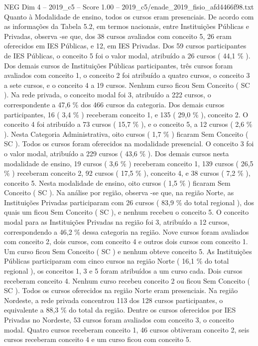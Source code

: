 \begin{textsample}{NEG Dim 4 – 2019\_c5 – Score 1.00 – 2019\_c5/enade\_2019\_fisio\_afd4466f98.txt}
Quanto à Modalidade de ensino, todos os cursos eram presenciais.
De acordo com as informações da Tabela 5.2, em termos nacionais, entre Instituições Públicas e Privadas, observa -se que, dos 38 cursos avaliados com conceito 5, 26 eram oferecidos em IES Públicas, e 12, em IES Privadas.
Dos 59 cursos participantes de IES Públicas, o conceito 5 foi o valor modal, atribuído a 26 cursos ( 44,1 \% ).
Dos demais cursos de Instituições Públicas participantes, três cursos foram avaliados com conceito 1, o conceito 2 foi atribuído a quatro cursos, o conceito 3 a sete cursos, e o conceito 4 a 19 cursos.
Nenhum curso ficou Sem Conceito ( SC ).
Na rede privada, o conceito modal foi 3, atribuído a 222 cursos, o correspondente a 47,6 \% dos 466 cursos da categoria.
Dos demais cursos participantes, 16 ( 3,4 \% ) receberam conceito 1, e 135 ( 29,0 \% ), conceito 2.
O conceito 4 foi atribuído a 73 cursos ( 15,7 \% ), e o conceito 5, a 12 cursos ( 2,6 \% ).
Nesta Categoria Administrativa, oito cursos ( 1,7 \% ) ficaram Sem Conceito ( SC ).
Todos os cursos foram oferecidos na modalidade presencial.
O conceito 3 foi o valor modal, atribuído a 229 cursos ( 43,6 \% ).
Dos demais cursos nesta modalidade de ensino, 19 cursos ( 3,6 \% ) receberam conceito 1, 139 cursos ( 26,5 \% ) receberam conceito 2, 92 cursos ( 17,5 \% ), conceito 4, e 38 cursos ( 7,2 \% ), conceito 5.
Nesta modalidade de ensino, oito cursos ( 1,5 \% ) ficaram Sem Conceito ( SC ).
Na análise por região, observa -se que, na região Norte, as Instituições Privadas participaram com 26 cursos ( 83,9 \% do total regional ), dos quais um ficou Sem Conceito ( SC ), e nenhum recebeu o conceito 5.
O conceito modal para as Instituições Privadas na região foi 3, atribuído a 12 cursos, correspondendo a 46,2 \% dessa categoria na região.
Nove cursos foram avaliados com conceito 2, dois cursos, com conceito 4 e outros dois cursos com conceito 1.
Um curso ficou Sem Conceito ( SC ) e nenhum obteve conceito 5.
As Instituições Públicas participaram com cinco cursos na região Norte ( 16,1 \% do total regional ), os conceitos 1, 3 e 5 foram atribuídos a um curso cada.
Dois cursos receberam conceito 4.
Nenhum curso recebeu conceito 2 ou ficou Sem Conceito ( SC ).
Todos os cursos oferecidos na região Norte eram presenciais.
Na região Nordeste, a rede privada concentrou 113 dos 128 cursos participantes, o equivalente a 88,3 \% do total da região.
Dentre os cursos oferecidos por IES Privadas no Nordeste, 53 cursos foram avaliados com conceito 3, o conceito modal.
Quatro cursos receberam conceito 1, 46 cursos obtiveram conceito 2, seis cursos receberam conceito 4 e um curso ficou com conceito 5.

\end{textsample}
